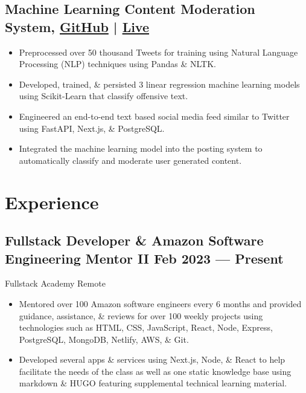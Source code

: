 \documentclass[a4,10pt]{article}
\newcommand{\subtext}[1]{
#1\par\vspace{-0.2cm}}
\newenvironment{zitemize}{
\begin{itemize}\itemsep0pt \parskip0pt \parsep1pt}
{\end{itemize}\vspace{-0.5cm}}
\begin{document}
\subsection*{Machine Learning Content Moderation System, {\normalsize \normalfont \href{https://github.com/xavierloeraflores/wgu-capstone}{GitHub}} | \normalsize \normalfont \href{https://wgu-capstone-xavier-loera-flores.vercel.app/}{Live} \hfill} 
\begin{zitemize}
       \item {Preprocessed over 50 thousand Tweets for training using Natural Language Processing (NLP) techniques using Pandas \& NLTK.} \\
       \item {Developed, trained, \& persisted 3 linear regression machine learning models using Scikit-Learn that classify offensive text. } \\
       \item {Engineered an end-to-end text based social media feed similar to Twitter using FastAPI, Next.js, \& PostgreSQL.} \\
        \item {Integrated the machine learning model into the posting system to automatically classify and moderate user generated content.} \\
       
     \end{zitemize}



\section{Experience}


\subsection*{Fullstack Developer \& Amazon Software Engineering Mentor II {\normalsize \normalfont} \hfill  Feb 2023 --- Present }
\subtext{Fullstack Academy \hfill Remote }
    \begin{zitemize}
        \item Mentored over 100 Amazon software engineers every 6 months and provided guidance, assistance, \& reviews for over 100 weekly projects using technologies such as HTML, CSS, JavaScript, React, Node, Express, PostgreSQL, MongoDB, Netlify, AWS, \& Git.
        \item Developed several apps \& services using Next.js, Node, \& React to help facilitate the needs of the class as well as one static knowledge base using markdown \& HUGO featuring supplemental technical learning material.
    \end{zitemize}
\end{document}
